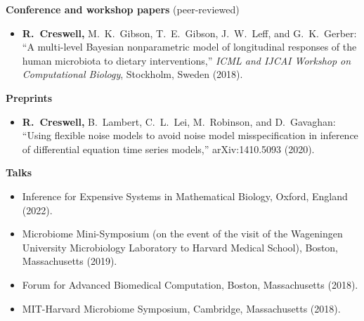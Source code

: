 \documentclass[11pt]{article}
\begin{document}
\vspace*{.4cm}
\noindent\textbf{Conference and workshop papers} (peer-reviewed)
\vspace*{.5cm}
\begin{itemize}[leftmargin=*]
\setlength{\itemsep}{4pt}
\setlength{\parskip}{0pt}
\setlength{\parsep}{0pt}
\vspace{-.5cm}
\item \textbf{R.\ Creswell,} {\color{gray} M.\ K.\ Gibson, T.\ E.\ Gibson, J.\ W.\ Leff, and G.\ K.\ Gerber:} ``A multi-level Bayesian nonparametric model of longitudinal responses of the human microbiota to dietary interventions,'' \emph{ICML and IJCAI
Workshop on Computational Biology}, Stockholm, Sweden (2018).
\end{itemize}

\vspace*{.4cm}
\noindent\textbf{Preprints}
\vspace*{.5cm}
\begin{itemize}[leftmargin=*]
\setlength{\itemsep}{4pt}
\setlength{\parskip}{0pt}
\setlength{\parsep}{0pt}
\vspace{-.5cm}





\item \textbf{R.\ Creswell,} {\color{gray} B.\ Lambert, C.\ L.\ Lei, M.\ Robinson, and D.\ Gavaghan:} ``Using flexible noise models to avoid noise model misspecification in inference of differential equation time series models,'' arXiv:1410.5093 (2020).
\end{itemize}

\vspace*{.4cm}

\noindent\textbf{Talks}
\vspace*{.5cm}
\begin{itemize}[leftmargin=*]
\setlength{\itemsep}{4pt}
\setlength{\parskip}{0pt}
\setlength{\parsep}{0pt}
\vspace{-.5cm}
\item Inference for Expensive Systems in Mathematical Biology, Oxford, England (2022).
\item Microbiome Mini-Symposium (on the event of the visit of the Wageningen University Microbiology Laboratory to Harvard Medical School), Boston, Massachusetts (2019).
\item Forum for Advanced Biomedical Computation, Boston, Massachusetts (2018).
\item MIT-Harvard Microbiome Symposium, Cambridge, Massachusetts (2018).
\end{itemize}
\end{document}
